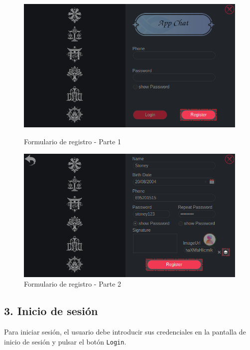 \begin{figure}[H]
    \centering
    \begin{minipage}[b]{0.48\textwidth}
        \centering
        \includegraphics[width=\textwidth]{images/manualDeUsuario/registro1.png}
        \caption*{Formulario de registro - Parte 1}
    \end{minipage}
    \hfill
    \begin{minipage}[b]{0.48\textwidth}
        \centering
        \includegraphics[width=\textwidth]{images/manualDeUsuario/registro2.png}
        \caption*{Formulario de registro - Parte 2}
    \end{minipage}
\end{figure}

\subsection*{3. Inicio de sesión}
Para iniciar sesión, el usuario debe introducir sus credenciales en la pantalla de inicio de sesión y pulsar el botón \texttt{Login}.

